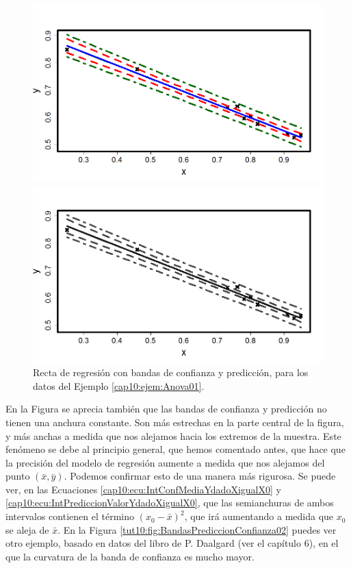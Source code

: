\begin{figure}[tb]
\begin{center}
\begin{enColor}
\includegraphics[width=14.5cm]{../fig/Cap10-BandasPrediccionConfianza.png}
\end{enColor}
\begin{bn}
\includegraphics[width=14.5cm]{../fig/Cap10-BandasPrediccionConfianza-bn.png}
\end{bn}
\end{center}
\caption{Recta de regresión con bandas de confianza y predicción, para los datos del Ejemplo \ref{cap10:ejem:Anova01}.}
\label{tut10:fig:BandasPrediccionConfianza}
\end{figure}

En la Figura se aprecia también que las bandas de confianza y predicción no tienen una anchura constante. Son más estrechas en la parte central de la figura, y más anchas a medida que nos alejamos hacia los extremos de la muestra. Este fenómeno se debe al principio general, que hemos comentado antes, que hace que la precisión del modelo de regresión aumente a medida que nos alejamos del punto $(\bar x,\bar y)$. Podemos confirmar esto de una manera más rigurosa. Se puede ver, en las Ecuaciones \ref{cap10:ecu:IntConfMediaYdadoXigualX0} y \ref{cap10:ecu:IntPrediccionValorYdadoXigualX0}, que las semianchuras de ambos intervalos contienen el término $(x_0-\bar x)^2$, que irá aumentando a medida que $x_0$ se aleja de $\bar x$. En la Figura \ref{tut10:fig:BandasPrediccionConfianza02} puedes ver otro ejemplo, basado en datos del libro \cite{dalgaard2008introductory} de P. Daalgard (ver el capítulo 6),  en el que la curvatura de la banda de confianza es mucho mayor.

